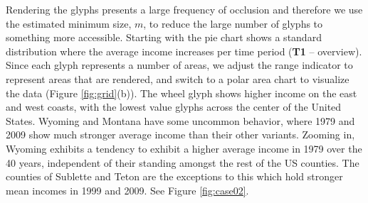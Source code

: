 Rendering the glyphs presents a large frequency of occlusion and therefore we use the estimated minimum size, $m$, to reduce the large number of glyphs to something more accessible.  Starting with the pie chart shows a standard distribution where the average income increases per time period (\textbf{T1} -- overview). Since each glyph represents a number of areas, we adjust the range indicator to represent areas that are rendered, and switch to a polar area chart to visualize the data (Figure \ref{fig:grid}(b)). The wheel glyph shows higher income on the east and west coasts, with the lowest value glyphs across the center of the United States. Wyoming and Montana have some uncommon behavior, where 1979 and 2009 show much stronger average income than their other variants. Zooming in, Wyoming exhibits a tendency to exhibit a higher average income in 1979 over the 40 years, independent of their standing amongst the rest of the US counties. The counties of Sublette and Teton are the exceptions to this which hold stronger mean incomes in 1999 and 2009. See Figure \ref{fig:case02}.


